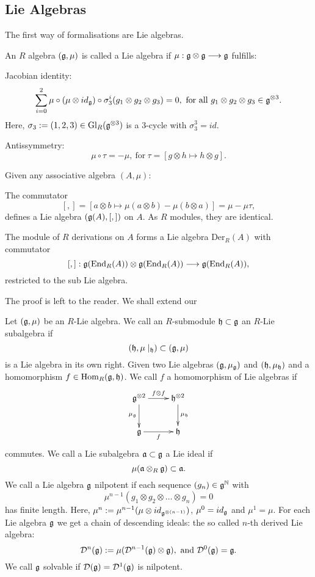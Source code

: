 \subsection{Lie Algebras}
The first way of formalisations are Lie algebras. 
\begin{defi}

An $R$ algebra $(\mathfrak{g},\mu)$ is called a Lie algebra if $\mu : \mathfrak{g} \otimes \mathfrak{g} \longrightarrow \mathfrak{g}$ fulfills:
\bn
\item Jacobian identity:
$$\sum_{i=0}^2 \mu \circ (\mu \otimes id_{\mathfrak{g}}) \circ \sigma_3^i(g_1 \otimes g_2 \otimes g_3) = 0,\ \mathrm{for~all}\ g_1 \otimes g_2 \otimes g_3 \in \mathfrak{g}^{\otimes 3}.$$
Here, $\sigma_3 := (1,2,3) \in \mathrm{Gl}_R(\mathfrak{g}^{\otimes3})$ is a $3$-cycle with $\sigma_3^3 = id$.
\item Antissymmetry:
$$\mu \circ \tau = - \mu,\ \mathrm{for}\ \tau = [g \otimes h \longmapsto h \otimes g].$$
\en
\end{defi}
\begin{koro}
Given any associative algebra $(A,\mu)$:
\bn
\item The commutator
$$[,] = [a \otimes b \longmapsto \mu(a \otimes b) - \mu(b \otimes a)] = \mu - \mu \tau,$$
defines a Lie algebra $(\mathfrak{g}(A),[,])$ on $A$. As $R$ modules, they are identical.
\item The module of $R$ derivations on $A$ forms a Lie algebra $\mathrm{Der}_R(A)$ with commutator 
$$[,] : \mathfrak{g}(\mathrm{End}_R(A)) \otimes \mathfrak{g}(\mathrm{End}_R(A)) \longrightarrow \mathfrak{g}(\mathrm{End}_R(A)),$$
restricted to the sub Lie algebra.
\en
\end{koro}
\bmk The proof is left to the reader. We shall extend our
\begin{defi}
Let $(\mathfrak{g},\mu)$ be an $R$-Lie algebra. We call an $R$-submodule $\mathfrak{h} \subset \mathfrak{g}$ an $R$-Lie subalgebra if
$$(\mathfrak{h},\mu\mid_{\mathfrak{h}}) \subset (\mathfrak{g},\mu)$$
is a Lie algebra in its own right. Given two Lie algebras $(\mathfrak{g},\mu_{\mathfrak{g}})$ and $(\mathfrak{h},\mu_{\mathfrak{h}})$ and a homomorphism $f \in \mathrm{Hom}_R(\mathfrak{g},\mathfrak{h})$. We call $f$ a homomorphism of Lie algebras if
$$\xymatrix{
\lieg^{\otimes 2}\ar[r]^{f\otimes f}\ar[d]_{\mu_{\lieg}}&\lieh^{\otimes 2}\ar[d]^{\mu_{\lieh}}\\
\lieg \ar[r]_f& \lieh\\
}$$
commutes. We call a Lie subalgebra $\mathfrak{a} \subset \mathfrak{g}$ a Lie ideal if
$$\mu(\mathfrak{a} \otimes_R \mathfrak{g}) \subset \mathfrak{a}.$$
We call a Lie algebra $\mathfrak{g}$ nilpotent if each sequence $(g_n) \in \mathfrak{g}^{\mathbb{N}}$ with
$$\mu^{n-1}(g_1 \otimes g_2 \otimes \ldots \otimes g_n) = 0$$
has finite length. Here, $\mu^n := \mu^{n-1}(\mu \otimes id_{\mathfrak{g}^{\otimes (n - 1)}})$, $\mu^0 = id_{\mathfrak{g}}$ and $\mu^1 = \mu$. For each Lie algebra $\mathfrak{g}$ we get a chain of descending ideals: the so called $n$-th derived Lie algebra:
$$\mathcal{D}^n(\lieg) := \mu(\mathcal{D}^{n-1}(\lieg) \otimes \lieg),\ \mathrm{and}\ \mathcal{D}^0(\lieg) = \lieg.$$
We call $\mathfrak{g}$ solvable if $\mathcal{D}(\mathfrak{g}) = \mathcal{D}^1(\mathfrak{g})$ is nilpotent. 
\end{defi}

